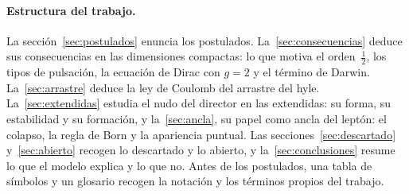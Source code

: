 \documentclass[11pt,a4paper]{article}
\newcommand{\apartado}[1]{\paragraph{#1}}
\begin{document}
\apartado{Estructura del trabajo.} La sección~\ref{sec:postulados} enuncia los postulados. La~\ref{sec:consecuencias} deduce sus consecuencias en las dimensiones compactas: lo que motiva el orden~$\tfrac12$, los tipos de pulsación, la ecuación de Dirac con $g=2$ y el término de Darwin. La~\ref{sec:arrastre} deduce la ley de Coulomb del arrastre del hyle. La~\ref{sec:extendidas} estudia el nudo del director en las extendidas: su forma, su estabilidad y su formación, y la~\ref{sec:ancla}, su papel como ancla del leptón: el colapso, la regla de Born y la apariencia puntual. Las secciones~\ref{sec:descartado} y~\ref{sec:abierto} recogen lo descartado y lo abierto, y la~\ref{sec:conclusiones} resume lo que el modelo explica y lo que no. Antes de los postulados, una tabla de símbolos y un glosario recogen la notación y los términos propios del trabajo.
\end{document}
